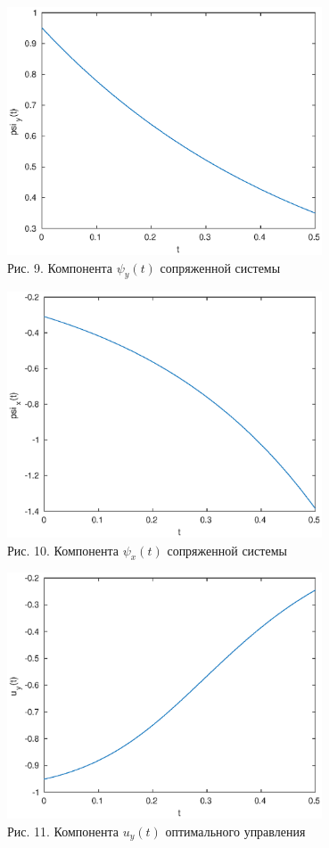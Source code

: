 \documentclass[11pt]{article}
\begin{document}
\begin{center}
	\includegraphics[width=0.7\textwidth]{pic_9.eps}\\
	{Рис. 9. Компонента $\psi_y(t)$ сопряженной системы}
\end{center}

\begin{center}
	\includegraphics[width=0.7\textwidth]{pic_10.eps}\\
	{Рис. 10. Компонента $\psi_x(t)$ сопряженной системы}
\end{center}

\begin{center}
	\includegraphics[width=0.7\textwidth]{pic_11.eps}\\
	{Рис. 11. Компонента $u_y(t)$ оптимального управления}
\end{center}
\end{document}
